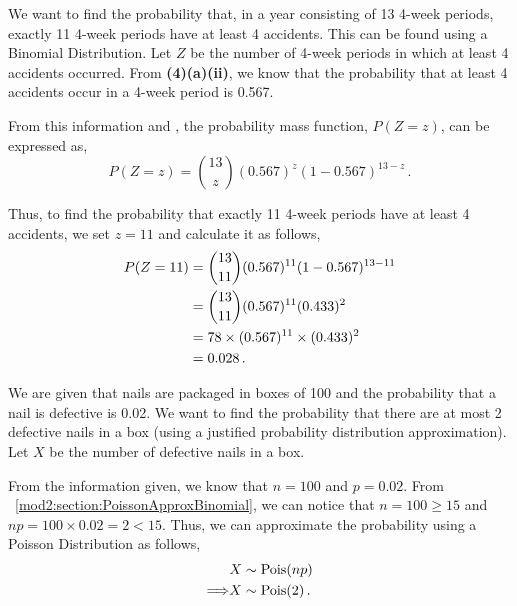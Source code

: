 \begin{subquestions}
\begin{subsubquestions}

\subsubquestion

We want to find the probability that, in a year consisting of 13 4-week periods, exactly 11 4-week periods have at least 4 accidents. This can be found using a Binomial Distribution. Let $Z$ be the number of 4-week periods in which at least 4 accidents occurred. From \textbf{(4)(a)(ii)}, we know that the probability that at least 4 accidents occur in a 4-week period is 0.567.

From this information and , the probability mass function, $P(Z=z)$, can be expressed as,
\begin{equation}
		P(Z = z) = { 13 \choose z} (0.567)^z  (1-0.567)^{13-z} \,.
\end{equation}

Thus, to find the probability that exactly 11 4-week periods have at least 4 accidents, we set $z=11$ and calculate it as follows,
\begin{align}
	P(Z = 11) & = { 13 \choose 11} (0.567)^{11}  (1-0.567)^{13-11} \nonumber \\
	          & = { 13 \choose 11} (0.567)^{11}  (0.433)^{2} \nonumber \\
	          & = 78 \times (0.567)^{11} \times (0.433)^{2} \nonumber \\
	          & = 0.028 \,.
\end{align}

\end{subsubquestions}


\subquestion

We are given that nails are packaged in boxes of 100 and the probability that a nail is defective is 0.02. We want to find the probability that there are at most 2 defective nails in a box (using a justified probability distribution approximation). Let $X$ be the number of defective nails in a box.

From the information given, we know that $n=100$ and $p=0.02$. From ~\ref{mod2:section:PoissonApproxBinomial}, we can notice that $n=100 \geq 15$ and $np= 100 \times 0.02=2<15.$ Thus, we can approximate the probability using a Poisson Distribution as follows,
\begin{align}
	& X \sim \text{Pois}(np) \nonumber \\
	\Longrightarrow & X \sim \text{Pois}(2) \,.
\end{align}


\end{subquestions}
